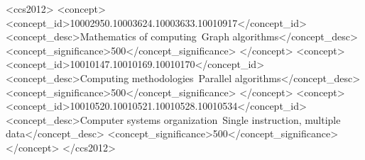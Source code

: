 \documentclass[sigconf, anonymous, review,table]{acmart}
\begin{document}
  
\begin{CCSXML}
<ccs2012>
 <concept>
   <concept_id>10002950.10003624.10003633.10010917</concept_id>
   <concept_desc>Mathematics of computing~Graph algorithms</concept_desc>
   <concept_significance>500</concept_significance>
 </concept>
 <concept>
   <concept_id>10010147.10010169.10010170</concept_id>
   <concept_desc>Computing methodologies~Parallel algorithms</concept_desc>
   <concept_significance>500</concept_significance>
 </concept>
 <concept>
   <concept_id>10010520.10010521.10010528.10010534</concept_id>
   <concept_desc>Computer systems organization~Single instruction, multiple data</concept_desc>
   <concept_significance>500</concept_significance>
 </concept>
</ccs2012>
\end{CCSXML}



\maketitle












\appendix

\end{document}
